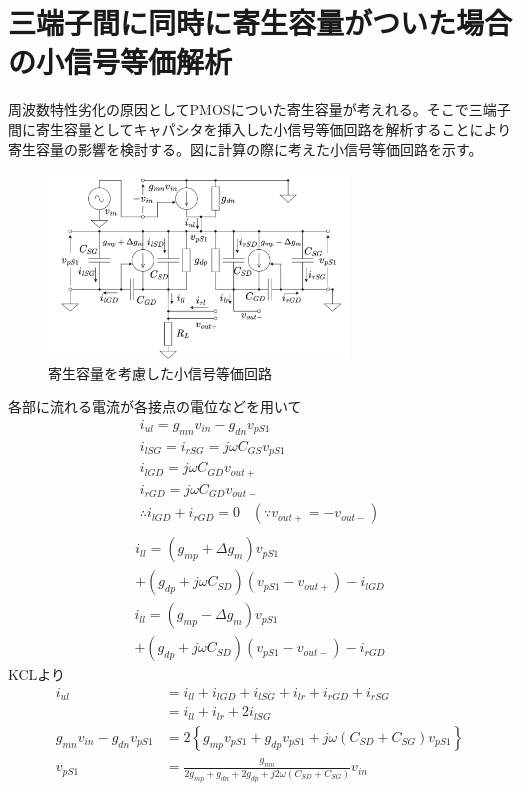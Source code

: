 \documentclass[twocolumn]{jsarticle}
\begin{document}
\section{三端子間に同時に寄生容量がついた場合の小信号等価解析}
    周波数特性劣化の原因としてPMOSについた寄生容量が考えれる。そこで三端子間に寄生容量としてキャパシタを挿入した小信号等価回路を解析することにより寄生容量の影響を検討する。図に計算の際に考えた小信号等価回路を示す。
    \begin{figure}[h]
        \begin{center}
            \includegraphics*[width=80mm]{figures/ParasiticCapacitoresEquivalent.png}
            \caption{寄生容量を考慮した小信号等価回路}
            \label{label:paracitic_eq}
        \end{center}
    \end{figure}
    各部に流れる電流が各接点の電位などを用いて  
    \begin{gather*}
        i_{ul}=g_{mn}v_{in}-g_{dn}v_{pS1}   \\
        i_{lSG}=i_{rSG}=j\omega C_{GS}v_{pS1}       \\
        i_{lGD}=j\omega C_{GD}v_{out+}      \\
        i_{rGD}=j\omega C_{GD}v_{out-}      \\
        \therefore i_{lGD}+i_{rGD}=0\;\;\;(\because v_{out+}=-v_{out-})     \\
    \end{gather*}
    \begin{multline*}
        i_{ll} = (g_{mp}+\Delta g_{m})v_{pS1}\\+(g_{dp}+j\omega C_{SD})(v_{pS1}-v_{out+})-i_{lGD}
    \end{multline*}
    \begin{multline*}
        i_{ll} = (g_{mp}-\Delta g_{m})v_{pS1}\\+(g_{dp}+j\omega C_{SD})(v_{pS1}-v_{out-})-i_{rGD}    
    \end{multline*}
    KCLより
    \begin{align*}
        i_{ul} &= i_{ll}+i_{lGD}+i_{lSG}+i_{lr}+i_{rGD}+i_{rSG}    \\
        &= i_{ll}+i_{lr}+2i_{lSG}   \\
        g_{mn}v_{in}-g_{dn}v_{pS1} &= 2\left\{ g_{mp}v_{pS1}+g_{dp}v_{pS1}+ j\omega( C_{SD}+C_{SG} ) v_{pS1} \right\}   \\
        v_{pS1} &= \frac{g_{mn}}{ 2g_{mp}+g_{dn}+2g_{dp}+j2\omega (C_{SD}+C_{SG}) }v_{in}
    \end{align*}
\end{document}
